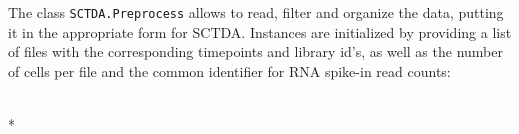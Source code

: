 \documentclass[letterpaper,10pt,english]{/usr/share/sphinx/texinputs/sphinxhowto}
\def\smaller{\fontsize{9.5pt}{9.5pt}\selectfont}
\begin{document}
The class \texttt{SCTDA.Preprocess} allows to read, filter and organize the
data, putting it in the appropriate form for SCTDA. Instances are
initialized by providing a list of files with the corresponding
timepoints and library id's, as well as the number of cells per file and
the common identifier for RNA spike-in read counts:


    
        \vspace{8pt}
        \makebox[0.1\linewidth]{\smaller\hfill\tt\color{nbframe-in-prompt}In\hspace{4pt}{[}2{]}:\hspace{4pt}}\\*
        \vspace{-2.1\baselineskip}
\end{document}
